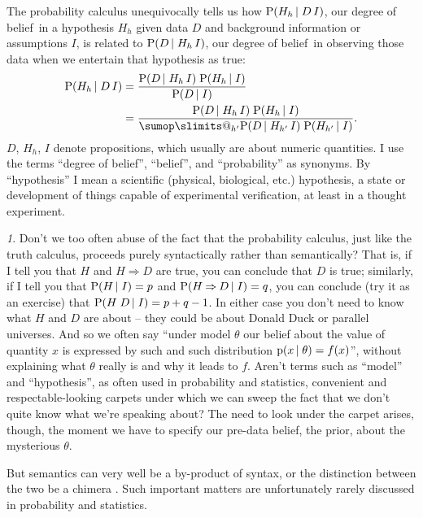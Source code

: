 \documentclass[\ifafour a4paper,12pt,\else a5paper,10pt,\fi%
onecolumn,oneside,article,%
british%
]{memoir}
\makeatletter
\theoremstyle{remark}
\theoremstyle{innote}
\newtheorem*{innote}{}
\def\sum{\DOTSI\sumop\slimits@}
\newcommand*{\citep}{\parencites}
\newcommand*{\limplies}{\mathbin{\Rightarrow}}%
\newcommand*{\pf}{\mathrm{p}}%
\newcommand*{\p}{\mathrm{P}}%
\renewcommand*{\|}[1][]{\nonscript\,#1\vert\nonscript\;\mathopen{}}
\newcommand*{\etc}{{etc.}}
\newcommand*{\dob}{degree of belief}
\newcommand*{\yK}{I}
\makeatother
\begin{document}
The probability calculus unequivocally tells us how
$\p(H_{h} \| D \, \yK)$, our \dob\ in a hypothesis $H_{h}$ given data $D$
and background information or assumptions $\yK$, is related to
$\p(D \| H_{h} \, \yK)$, our \dob\ in observing those data when we
entertain that hypothesis as true:
\begin{subequations}
    \label{eq:posterior_hypothesis}
  \begin{align}
    \label{eq:posterior_hypothesis_universal}
    \p(H_{h} \| D \, \yK) &=
    \frac{\p(D \| H_{h} \, \yK)\;\p(H_{h} \| \yK)}{\p(D \| \yK)}\\
    \label{eq:posterior_hypothesis_sethypotheses}
    &=\frac{\p(D \| H_{h} \, \yK)\;\p(H_{h} \| \yK)}{\sum_{h'} \p(D \| H_{h'} \, \yK)\; \p(H_{h'} \| \yK)}.
  \end{align}
\end{subequations}
$D$, $H_{h}$, $\yK$ denote propositions, which usually are about numeric
quantities. I use the terms \enquote{\dob}, \enquote{belief}, and
\enquote{probability} as synonyms. By \enquote{hypothesis} I mean a
scientific (physical, biological, \etc) hypothesis, a state or development
of things capable of experimental verification, at least in a thought
experiment.
\begin{innote}
  Don't we too often abuse of the fact that the probability calculus, just
  like the truth calculus, proceeds purely syntactically rather than
  semantically? That is, if I tell you that $H$ and $H \limplies D$ are
  true, you can conclude that $D$ is true; similarly, if I tell you that
  $\p(H \| \yK) = p$ and $\p(H \limplies D \| \yK) = q$, you can conclude
  (try it as an exercise) that $\p(H\;D \| \yK) = p + q -1$. In either case
  you don't need to know what $H$ and $D$ are about -- they could be about
  Donald Duck or parallel universes. And so we often say \enquote{under
    model $\theta$ our belief about the value of quantity $x$ is expressed
    by such and such distribution $\pf(x \| \theta)=f(x)$}, without
  explaining what $\theta$ really is and why it leads to $f$. Aren't terms
  such as \enquote{model} and \enquote{hypothesis}, as often used in
  probability and statistics, convenient and respectable-looking carpets
  under which we can sweep the fact that we don't quite know what we're
  speaking about? The need to look under the carpet arises, though, the
  moment we have to specify our pre-data belief, the prior, about the
  mysterious $\theta$.
  
  But semantics can very well be a by-product of syntax, or the distinction
  between the two be a chimera
  \citep{wittgenstein1945_t1999,girard2001,girard2003}. Such important
  matters are unfortunately rarely discussed in probability and statistics.
\end{innote}
\end{document}
